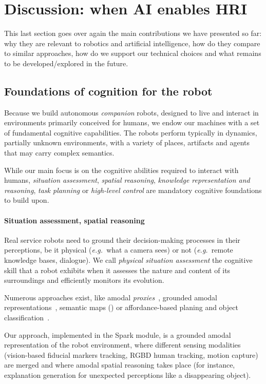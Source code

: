 \documentclass[preprint,3p,times]{elsarticle}
\newcommand{\eg}{{\textit{e.g.\ }}}
\begin{document}
\section{Discussion: when AI enables HRI}
\label{sect|conclusion}

This last section goes over again the main contributions we have presented
so far: why they are relevant to robotics and artificial intelligence, how do
they compare to similar approaches, how do we support our technical choices and
what remains to be developed/explored in the future.

\subsection{Foundations of cognition for the robot}

Because we build autonomous \emph{companion} robots, designed to live and
interact in environments primarily conceived for humans, we endow our machines
with a set of fundamental cognitive capabilities. The robots perform typically
in dynamics, partially unknown environments, with a variety of places,
artifacts and agents that may carry complex semantics.

While our main focus is on the cognitive abilities required to interact with
humans, \emph{situation assessment}, \emph{spatial reasoning}, \emph{knowledge
representation and reasoning}, \emph{task planning} or \emph{high-level
control} are mandatory cognitive foundations to build upon.

\paragraph{Situation assessment, spatial reasoning}

Real service robots need to ground their decision-making processes in their
perceptions, be it physical (\eg what a camera sees) or not (\eg remote
knowledge bases, dialogue). We call \emph{physical situation assessment} the
cognitive skill that a robot exhibits when it assesses the nature and content of its
surroundings and efficiently monitors its evolution.

Numerous approaches exist, like amodal \emph{proxies}~\cite{Jacobsson2008},
grounded amodal representations~\cite{Mavridis2006}, semantic maps
(\cite{Nuechter2008, Galindo2008,Blodow2011}) or
affordance-based planing and object classification~\cite{Lorken2008,
Varadarajan2011}.

Our approach, implemented in the {\sc Spark} module, is a grounded amodal
representation of the robot environment, where different sensing modalities
(vision-based fiducial markers tracking, RGBD human tracking, motion capture)
are merged and where amodal spatial reasoning takes place (for instance,
explanation generation for unexpected perceptions like a disappearing object).
\end{document}
